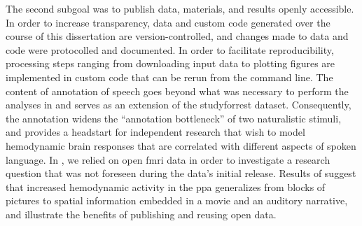 %
The second subgoal was to publish data, materials, and results openly
accessible.
%
In order to increase transparency, data and custom code generated over the
course of this dissertation are version-controlled, and changes made to data and
code were protocolled and documented.
%
In order to facilitate reproducibility, processing steps ranging from
downloading input data to plotting figures are implemented in custom code that
can be rerun from the command line.
%
The content of annotation of speech \citep{haeusler2021speechanno} goes beyond
what was necessary to perform the analyses in \citet{haeusler2022processing} and
serves as an extension of the studyforrest dataset.
%
Consequently, the annotation widens the ``annotation bottleneck'' \citep[][p.
16]{aliko2020naturalistic} of two naturalistic stimuli, and provides a headstart
for independent research that wish to model hemodynamic brain responses that are
correlated with different aspects of spoken language.
%
In \citet{haeusler2022processing}, we relied on open \ac{fmri} data in order to
investigate a research question that was not foreseen during the data's initial
release.
%
Results of \citet{haeusler2022processing} suggest that increased hemodynamic
activity in the \ac{ppa} generalizes from blocks of pictures to spatial
information embedded in a movie and an auditory narrative, and illustrate the
benefits of publishing and reusing open data.

